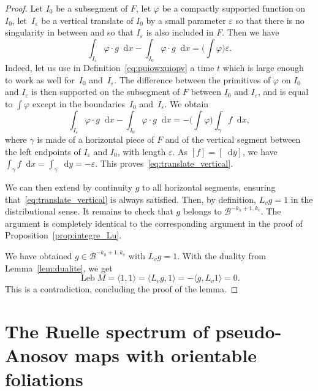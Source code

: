\documentclass[JEP,XML,SOM,Unicode]{cedram}
\newcommand{\boB}{\mathcal{B}}
\newcommand{\dd}{\mathop{}\!\mathrm{d}}
\newcommand{\paregg}[1]{\biggl(#1\biggr)}
\DeclareMathOperator{\Leb}{Leb}
\let\epsilon\varepsilon
\let\phi\varphi
\theoremstyle{definition}
\numberwithin{equation}{section}
\begin{document}
\begin{proof}
Let $I_0$ be a subsegment of $F$, let $\phi$ be a compactly supported
function on $I_0$, let~$I_\epsilon$ be a vertical translate of $I_0$ by a
small parameter $\epsilon$ so that there is no singularity in between and so
that $I_\epsilon$ is also included in $F$. Then we have\vspace*{-3pt}
\begin{equation}
\label{eq:translate_vertical}
\int_{I_\epsilon} \phi \cdot g \dd x - \int_{I_0} \phi \cdot g \dd x = \paregg{\int \phi} \epsilon.
\end{equation}
Indeed, let us use in Definition~\eqref{eq:puiowxuiopv} a time $t$ which is
large enough to work as well for~$I_0$ and~$I_\epsilon$. The difference
between the primitives of $\phi$ on $I_0$ and $I_\epsilon$ is then supported
on the subsegment of $F$ between $I_0$ and $I_\epsilon$, and is equal to
$\int \phi$ except in the boundaries~$I_0$ and~$I_\epsilon$. We obtain\vspace*{-3pt}
\begin{equation*}
\int_{I_\epsilon} \phi \cdot g \dd x - \int_{I_0} \phi \cdot g \dd x = - \paregg{\int \phi} \int_\gamma f \dd x,
\end{equation*}
where $\gamma$ is made of a horizontal piece of $F$ and of the vertical
segment between the left endpoints of $I_\epsilon$ and $I_0$, with length
$\epsilon$. As $[f] = [\dd y]$, we have $\int_\gamma f \dd x = \int_\gamma
\dd y = - \epsilon$. This proves~\eqref{eq:translate_vertical}.

We can then extend by continuity $g$ to all horizontal segments, ensuring
that~\eqref{eq:translate_vertical} is always satisfied. Then, by definition,
$L_v g = 1$ in the distributional sense. It remains to check that $g$ belongs
to $\boB^{-k_h+1, k_v}$. The argument is completely identical to the
corresponding argument in the proof of Proposition~\ref{prop:integre_Lu}.

We have obtained $g \in \boB^{-k_h+1, k_v}$ with $L_v g = 1$. With the
duality from Lemma~\ref{lem:dualite}, we get\vspace*{-5pt}
\begin{equation*}
\Leb M = \langle 1, 1\rangle = \langle L_v g, 1 \rangle = - \langle g, L_v 1 \rangle
= 0.
\end{equation*}
This is a contradiction, concluding the proof of the lemma.
\end{proof}

\section{The Ruelle spectrum of pseudo-Anosov maps with orientable
foliations}
\end{document}
